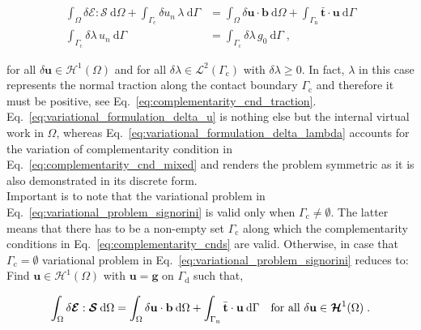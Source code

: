 \documentclass[10pt,a4paper]{article}
\begin{document}
\begin{subequations}
	\begin{alignat}{1}
		\int_{\Omega} \delta \boldsymbol{\mathcal{E}} : \boldsymbol{\mathcal{S}} \: \text{d} \Omega + \int_{\Gamma_{\text{c}}} \delta u_n \, \lambda \: \text{d} \Gamma &= \int_{\Omega} \delta \mathbf{u} \cdot \mathbf{b} \: \text{d} \Omega + \int_{\Gamma_{\text{n}}} \bar{\mathbf{t}} \cdot \mathbf{u} \: \text{d} \Gamma \label{eq:variational_formulation_delta_u} \\
		\int_{\Gamma_{\text{c}}} \delta \lambda \, u_n \: \text{d} \Gamma &= \int_{\Gamma_{\text{c}}} \delta \lambda \, g_0 \: \text{d} \Gamma \;, \label{eq:variational_formulation_delta_lambda}
	\end{alignat}
	\label{eq:variational_problem_signorini}
\end{subequations}

for all $\delta \mathbf{u} \in \boldsymbol{\mathcal{H}}^1 (\Omega)$ and for all $\delta \lambda \in \mathcal{L}^2(\Gamma_{\text{c}})$ with $\delta \lambda \ge 0$. In fact, $\lambda$ in this case represents the normal traction along the contact boundary $\Gamma_{\text{c}}$ and therefore it must be positive, see Eq.~\eqref{eq:complementarity_cnd_traction}. Eq.~\eqref{eq:variational_formulation_delta_u} is nothing else but the internal virtual work in $\Omega$, whereas Eq.~\eqref{eq:variational_formulation_delta_lambda} accounts for the variation of complementarity condition in Eq.~\eqref{eq:complementarity_cnd_mixed} and renders the problem symmetric as it is also demonstrated in its discrete form.\\

Important is to note that the variational problem in Eq.~\eqref{eq:variational_problem_signorini} is valid only when $\Gamma_{\text{c}} \neq \emptyset$. The latter means that there has to be a non-empty set $\Gamma_{\text{c}}$ along which the complementarity conditions in Eq.~\eqref{eq:complementarity_cnds} are valid. Otherwise, in case that $\Gamma_{\text{c}} = \emptyset$ variational problem in Eq.~\eqref{eq:variational_problem_signorini} reduces to: Find $\mathbf{u} \in \boldsymbol{\mathcal{H}}^1 (\Omega)$ with $\mathbf{u} = \mathbf{g}$ on $\Gamma_{\text{d}}$ such that,

\begin{equation}
	\int_{\Omega} \delta \boldsymbol{\mathcal{E}} : \boldsymbol{\mathcal{S}} \: \text{d} \Omega = \int_{\Omega} \delta \mathbf{u} \cdot \mathbf{b} \: \text{d} \Omega + \int_{\Gamma_{\text{n}}} \bar{\mathbf{t}} \cdot \mathbf{u} \: \text{d} \Gamma \quad \text{for all } \delta \mathbf{u} \in \boldsymbol{\mathcal{H}}^1 (\Omega) \;. \label{eq:variational_formulation_structural_mechanics} \\
\end{equation} 
\end{document}
